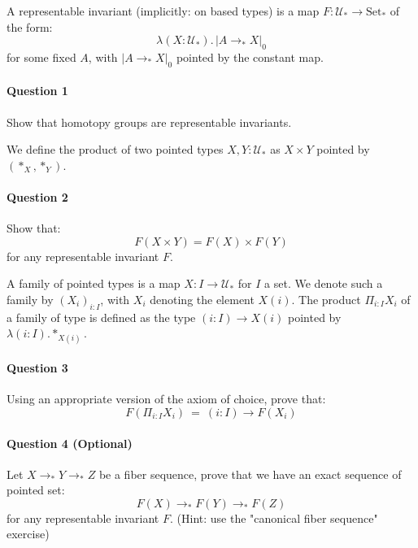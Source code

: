 \documentclass{article}[6pt]%
\newcommand{\U}{{\mathcal U}}
\renewcommand{\r}{\rightarrow}
\newcommand{\Gl}{\lambda}
\newcommand{\Set}{\mathrm{Set}}
\begin{document}
\begin{Exercise}[title={Representable invariants}]
A representable invariant (implicitly: on based types) is a map $F : \U_* \r \Set_*$ of the form:
\[\Gl (X:\U_*).\, |A\r_* X|_0 \]
for some fixed $A$, with $|A\r_*X|_0$ pointed by the constant map. 

\paragraph{Question 1} Show that homotopy groups are representable invariants.
\vspace{0.6cm}

\noindent We define the product of two pointed types $X,Y:\U_*$ as $X\times Y$ pointed by $(*_X,*_Y)$.
\paragraph{Question 2} Show that:
\[F(X\times Y) = F(X)\times F(Y)\]
for any representable invariant $F$.
\vspace{0.6cm}

\noindent A family of pointed types is a map $X:I\r \U_*$ for $I$ a set. We denote such a family by $(X_i)_{i:I}$, with $X_i$ denoting the element $X(i)$. 
The product $\Pi_{i:I}X_i$ of a family of type is defined as the type $(i:I)\r X(i)$ pointed by $\Gl (i:I).*_{X(i)}$.

\paragraph{Question 3}  Using an appropriate version of the axiom of choice, prove that: 
\[F(\Pi_{i:I}X_i) \ = \ (i:I)\r F(X_i)\]  

\paragraph{Question 4 (Optional)} Let $X\r_* Y\r_* Z$ be a fiber sequence, prove that we have an exact sequence of pointed set:
\[F(X)\r_* F(Y)\r_* F(Z)\]
for any representable invariant $F$. (Hint: use the "canonical fiber sequence" exercise)

\end{Exercise}
\end{document}
